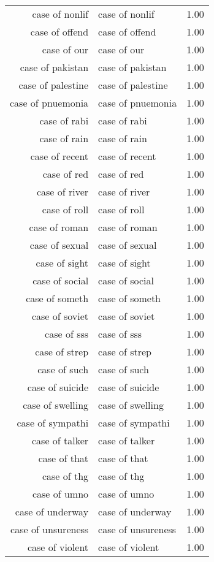 \begin{table}[ht]
\begin{tabular}{rlr}
  case of nonlif & case of nonlif & 1.00 \\ 
  case of offend & case of offend & 1.00 \\ 
  case of our & case of our & 1.00 \\ 
  case of pakistan & case of pakistan & 1.00 \\ 
  case of palestine & case of palestine & 1.00 \\ 
  case of pnuemonia & case of pnuemonia & 1.00 \\ 
  case of rabi & case of rabi & 1.00 \\ 
  case of rain & case of rain & 1.00 \\ 
  case of recent & case of recent & 1.00 \\ 
  case of red & case of red & 1.00 \\ 
  case of river & case of river & 1.00 \\ 
  case of roll & case of roll & 1.00 \\ 
  case of roman & case of roman & 1.00 \\ 
  case of sexual & case of sexual & 1.00 \\ 
  case of sight & case of sight & 1.00 \\ 
  case of social & case of social & 1.00 \\ 
  case of someth & case of someth & 1.00 \\ 
  case of soviet & case of soviet & 1.00 \\ 
  case of sss & case of sss & 1.00 \\ 
  case of strep & case of strep & 1.00 \\ 
  case of such & case of such & 1.00 \\ 
  case of suicide & case of suicide & 1.00 \\ 
  case of swelling & case of swelling & 1.00 \\ 
  case of sympathi & case of sympathi & 1.00 \\ 
  case of talker & case of talker & 1.00 \\ 
  case of that & case of that & 1.00 \\ 
  case of thg & case of thg & 1.00 \\ 
  case of umno & case of umno & 1.00 \\ 
  case of underway & case of underway & 1.00 \\ 
  case of unsureness & case of unsureness & 1.00 \\ 
  case of violent & case of violent & 1.00 \\ 

\end{tabular}
\end{table}
